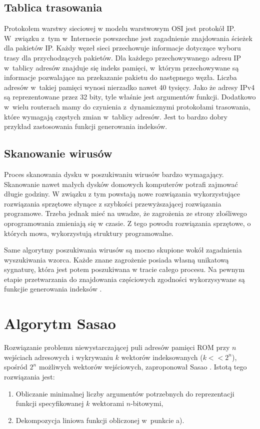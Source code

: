 \subsection{Tablica trasowania}
Protokołem warstwy sieciowej w modelu warstwowym OSI jest protokół IP.
W~związku z~tym w~Internecie powszechne jest zagadnienie znajdowania ścieżek dla pakietów IP.
Każdy węzeł sieci przechowuje informacje dotyczące wyboru trasy dla przychodzących pakietów.
Dla każdego przechowywanego adresu IP w~tablicy adresów znajduje się indeks pamięci,
w~którym przechowywane są informacje pozwalające na przekazanie pakietu do następnego węzła.
Liczba adresów w~takiej pamięci wynosi nierzadko nawet 40 tysięcy.
Jako że adresy IPv4 są reprezentowane przez 32 bity, tyle właśnie jest argumentów funkcji.
Dodatkowo w~wielu routerach mamy do czynienia z~dynamicznymi protokołami trasowania,
które wymagają częstych zmian w~tablicy adresów.
Jest to bardzo dobry przykład zastosowania funkcji generowania indeksów.

\subsection{Skanowanie wirusów}
Proces skanowania dysku w poszukiwaniu wirusów bardzo wymagający.
Skanowanie nawet małych dysków domowych komputerów potrafi zajmować długie godziny.
W związku z tym powstają nowe rozwiązania wykorzystujące rozwiązania sprzętowe słynące z szybkości przewyższającej rozwiązania programowe.
Trzeba jednak mieć na uwadze, że zagrożenia ze strony złośliwego oprogramowania zmieniają się w czasie.
Z tego powodu rozwiązania sprzętowe, o których mowa, wykorzystują struktury programowalne.

Same algorytmy poszukiwania wirusów są mocno skupione wokół zagadnienia wyszukiwania wzorca.
Każde znane zagrożenie posiada własną unikatową sygnaturę,
która jest potem poszukiwana w tracie całego procesu.
Na pewnym etapie przetwarzania do znajdowania częściowych zgodności wykorzysywane są funkcjie generowania indeksów \cite{wirusy}.

\section{Algorytm Sasao}
Rozwiązanie problemu niewystarczającej puli adresów pamięci ROM przy $n$ wejściach adresowych i wykrywaniu $k$ wektorów indeksowanych ($k<<2^n$),
spośród $2^n$ możliwych wektorów wejściowych,
zaproponował Sasao \cite{sasao-workshop, sasao-recent, sasao-s-min, sasao-synthesis}.
Istotą tego rozwiązania jest:
\begin{enumerate}[label=\alph*)]
\item Obliczanie minimalnej liczby argumentów potrzebnych do reprezentacji funkcji specyfikowanej $k$ wektorami $n$-bitowymi,
\item Dekompozycja liniowa funkcji obliczonej w~punkcie a).
\end{enumerate}

